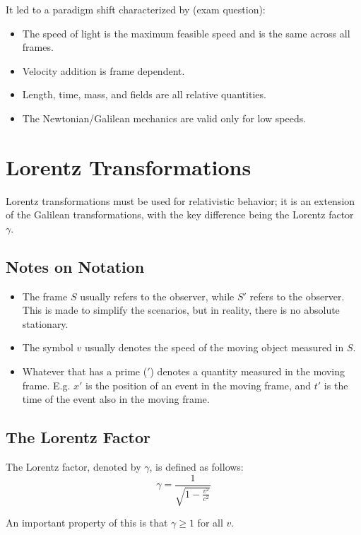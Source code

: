 \documentclass[a4paper,12pt]{article}
\let\oldsection\section
\renewcommand\section{\clearpage\oldsection}
\begin{document}
It led to a paradigm shift characterized by (exam question):
\begin{itemize}
  \item The speed of light is the maximum feasible speed and is the same across all frames.
  \item Velocity addition is frame dependent.
  \item Length, time, mass, and fields are all relative quantities.
  \item The Newtonian/Galilean mechanics are valid only for low speeds.
\end{itemize}


\section{Lorentz Transformations}

Lorentz transformations must be used for relativistic behavior; it is an extension of the Galilean transformations, with the key difference being the Lorentz factor $\gamma$.

\subsection{Notes on Notation}
\begin{itemize}
  \item The frame $S$ usually refers to the  observer, while $S'$ refers to the  observer. This is made to simplify the scenarios, but in reality, there is no absolute stationary.
  \item The symbol $v$ usually denotes the speed of the moving object measured in $S$.
  \item Whatever that has a prime ($'$) denotes a quantity measured in the moving frame. E.g. $x'$ is the position of an event in the moving frame, and $t'$ is the time of the event also in the moving frame.
\end{itemize}

\subsection{The Lorentz Factor}

The Lorentz factor, denoted by $\gamma$, is defined as follows:
\begin{equation}\label{eq:lorentz}
  \gamma = \frac{1}{\sqrt{1 - \frac{v^2}{c^2}}}
\end{equation}

An important property of this is that $\gamma \geq 1$ for all $v$.
\pagebreak
\end{document}
